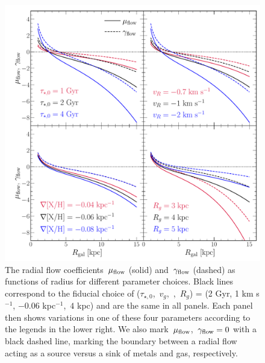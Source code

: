 \begin{figure}
\centering
\includegraphics[scale = 0.5]{chapter7/muflow_gammaflow_vs_radius.pdf}
\caption{
The radial flow coefficients~$\mu_{\text{flow}}$ (solid) and~$\gamma_{\text{flow}}$ (dashed) as
functions of radius for different parameter choices.
Black lines correspond to the fiducial choice of
($\tau_{\star,0}$,~$v_g$,~,~$R_g$) = (2 Gyr, 1 km s$^{-1}$,
$-0.06$ kpc$^{-1}$,~$4$ kpc) and are the same in all panels.
Each panel then shows variations in one of these four parameters according to
the legends in the lower right.
We also mark~$\mu_{\text{flow}}$,~$\gamma_{\text{flow}} = 0$ with a black dashed line, marking
the boundary between a radial flow acting as a source versus a sink of metals
and gas, respectively.
}
\label{outflows:fig:flow-coefficients-vs-radius}
\end{figure}

